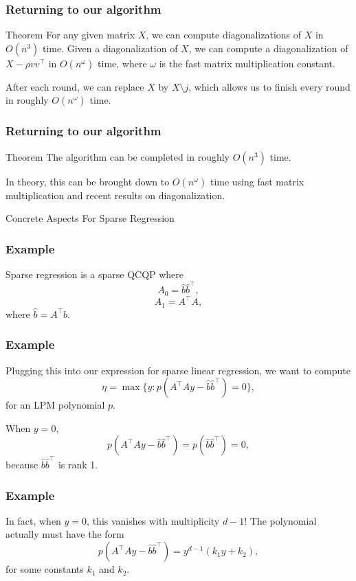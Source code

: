 \documentclass{beamer}
\begin{document}
\begin{frame}
    \frametitle{Returning to our algorithm}
    \begin{block}{Theorem}
        For any given matrix $X$, we can compute diagonalizations of $X$ in $O(n^3)$ time.
        Given a diagonalization of $X$, we can compute a diagonalization of $X - \rho vv^{\intercal}$ in $O(n^{\omega})$ time, where $\omega$ is the fast matrix multiplication constant.
    \end{block}
    After each round, we can replace $X$ by $X \setminus j$, which allows us to finish every round in roughly $O(n^{\omega})$ time.
\end{frame}
\begin{frame}
    \frametitle{Returning to our algorithm}
    \begin{block}{Theorem}
        The algorithm can be completed in roughly $O(n^3)$ time.
    \end{block}
    In theory, this can be brought down to $O(n^{\omega})$ time using fast matrix multiplication and recent results on diagonalization.
\end{frame}
\begin{frame}
    \centering
    \huge
    {\color{gray}Concrete Aspects For Sparse Regression}
\end{frame}
\begin{frame}
    \frametitle{Example}
    Sparse regression is a sparse QCQP where
    \[
        A_0 = \hat{b}\hat{b}^{\intercal},
    \]
    \[
        A_1 = A^{\intercal}A,
    \]
    where $\hat{b} = A^{\intercal}b$.
\end{frame}
\begin{frame}
    \frametitle{Example}
    Plugging this into our expression for sparse linear regression, we want to compute
    \[
        \eta = \max \{y : p(A^{\intercal}Ay-\hat{b}\hat{b}^{\intercal}) = 0 \},
    \]
    for an LPM polynomial $p$.

    \pause
    When $y = 0$, 
    \[
        p(A^{\intercal}Ay-\hat{b}\hat{b}^{\intercal}) = p(\hat{b}\hat{b}^{\intercal}) = 0,
    \]
    because $\hat{b}\hat{b}^{\intercal}$ is rank 1.


\end{frame}
\begin{frame}
    \frametitle{Example}
    In fact, when $y=0$, this vanishes with multiplicity $d-1$! The polynomial actually must have the form
    \[
        p(A^{\intercal}Ay-\hat{b}\hat{b}^{\intercal}) = y^{d-1}(k_1y+k_2),
    \]
    for some constants $k_1$ and $k_2$.
\end{frame}
\end{document}
